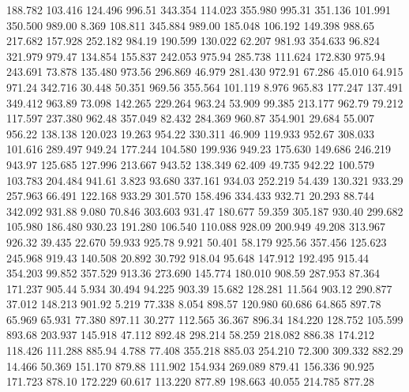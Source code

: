  188.782  103.416  124.496       996.51
 343.354  114.023  355.980       995.31
 351.136  101.991  350.500       989.00
   8.369  108.811  345.884       989.00
 185.048  106.192  149.398       988.65
 217.682  157.928  252.182       984.19
 190.599  130.022   62.207       981.93
 354.633   96.824  321.979       979.47
 134.854  155.837  242.053       975.94
 285.738  111.624  172.830       975.94
 243.691   73.878  135.480       973.56
 296.869   46.979  281.430       972.91
  67.286   45.010   64.915       971.24
 342.716   30.448   50.351       969.56
 355.564  101.119    8.976       965.83
 177.247  137.491  349.412       963.89
  73.098  142.265  229.264       963.24
  53.909   99.385  213.177       962.79
  79.212  117.597  237.380       962.48
 357.049   82.432  284.369       960.87
 354.901   29.684   55.007       956.22
 138.138  120.023   19.263       954.22
 330.311   46.909  119.933       952.67
 308.033  101.616  289.497       949.24
 177.244  104.580  199.936       949.23
 175.630  149.686  246.219       943.97
 125.685  127.996  213.667       943.52
 138.349   62.409   49.735       942.22
 100.579  103.783  204.484       941.61
   3.823   93.680  337.161       934.03
 252.219   54.439  130.321       933.29
 257.963   66.491  122.168       933.29
 301.570  158.496  334.433       932.71
  20.293   88.744  342.092       931.88
   9.080   70.846  303.603       931.47
 180.677   59.359  305.187       930.40
 299.682  105.980  186.480       930.23
 191.280  106.540  110.088       928.09
 200.949   49.208  313.967       926.32
  39.435   22.670   59.933       925.78
   9.921   50.401   58.179       925.56
 357.456  125.623  245.968       919.43
 140.508   20.892   30.792       918.04
  95.648  147.912  192.495       915.44
 354.203   99.852  357.529       913.36
 273.690  145.774  180.010       908.59
 287.953   87.364  171.237       905.44
   5.934   30.494   94.225       903.39
  15.682  128.281   11.564       903.12
 290.877   37.012  148.213       901.92
   5.219   77.338    8.054       898.57
 120.980   60.686   64.865       897.78
  65.969   65.931   77.380       897.11
  30.277  112.565   36.367       896.34
 184.220  128.752  105.599       893.68
 203.937  145.918   47.112       892.48
 298.214   58.259  218.082       886.38
 174.212  118.426  111.288       885.94
   4.788   77.408  355.218       885.03
 254.210   72.300  309.332       882.29
  14.466   50.369  151.170       879.88
 111.902  154.934  269.089       879.41
 156.336   90.925  171.723       878.10
 172.229   60.617  113.220       877.89
 198.663   40.055  214.785       877.28
